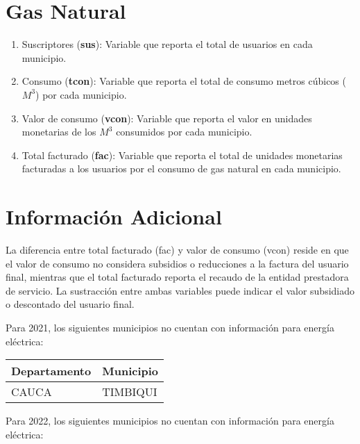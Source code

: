 \documentclass[12pt,a4paper]{article}
\begin{document}
\section{Gas Natural}

\begin{enumerate}
	\item Suscriptores (\textbf{sus}): Variable que reporta el total de usuarios en cada municipio.
	\item Consumo (\textbf{tcon}): Variable que reporta el total de consumo metros cúbicos ($M^3$) por cada municipio.
	\item Valor de consumo (\textbf{vcon}): Variable que reporta el valor en unidades monetarias de los $M^3$ consumidos por cada municipio.
	\item Total facturado (\textbf{fac}): Variable que reporta el total de unidades monetarias facturadas a los usuarios por el consumo de gas natural en cada municipio.
\end{enumerate}


\section*{Información Adicional}

La diferencia entre total facturado (fac) y valor de consumo (vcon) reside en que el valor de consumo no considera subsidios o reducciones a la factura del usuario final, mientras que el total facturado reporta el recaudo de la entidad prestadora de servicio. La sustracción entre ambas variables puede indicar el valor subsidiado o descontado del usuario final.

Para 2021, los siguientes municipios no cuentan con información para energía eléctrica:

\begin{table}[h!]
	\centering
	\begin{tabular}{@{}ll@{}}
		\toprule
		\textbf{Departamento} & \textbf{Municipio} \\ \midrule
		CAUCA                 & TIMBIQUI           \\ \bottomrule
	\end{tabular}
\end{table}

Para 2022, los siguientes municipios no cuentan con información para energía eléctrica:
\end{document}
